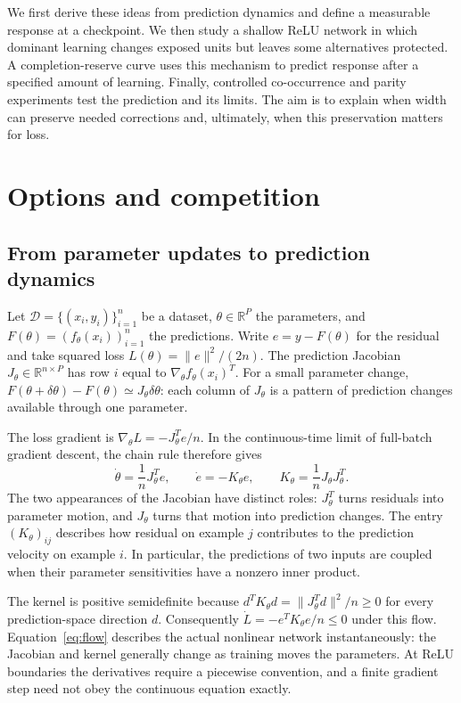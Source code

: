 \documentclass[11pt,a4paper]{article}
\begin{document}
We first derive these ideas from prediction dynamics and define a measurable response at a checkpoint. We then study a shallow ReLU network in which dominant learning changes exposed units but leaves some alternatives protected. A completion-reserve curve uses this mechanism to predict response after a specified amount of learning. Finally, controlled co-occurrence and parity experiments test the prediction and its limits. The aim is to explain when width can preserve needed corrections and, ultimately, when this preservation matters for loss.

\section{Options and competition}
\label{sec:core}

\subsection{From parameter updates to prediction dynamics}

Let $\mathcal D=\{(x_i,y_i)\}_{i=1}^n$ be a dataset, $\theta\in\mathbb R^P$ the parameters, and $F(\theta)=(f_\theta(x_i))_{i=1}^n$ the predictions. Write $e=y-F(\theta)$ for the residual and take squared loss $L(\theta)=\|e\|^2/(2n)$. The prediction Jacobian $J_\theta\in\mathbb R^{n\times P}$ has row $i$ equal to $\nabla_\theta f_\theta(x_i)^T$. For a small parameter change, $F(\theta+\delta\theta)-F(\theta)\simeq J_\theta\delta\theta$: each column of $J_\theta$ is a pattern of prediction changes available through one parameter.

The loss gradient is $\nabla_\theta L=-J_\theta^Te/n$. In the continuous-time limit of full-batch gradient descent, the chain rule therefore gives
\begin{equation}
 \dot\theta=\frac1n J_\theta^T e,\qquad
 \dot e=-K_\theta e,\qquad K_\theta=\frac1nJ_\theta J_\theta^T.
 \label{eq:flow}
\end{equation}
The two appearances of the Jacobian have distinct roles: $J_\theta^T$ turns residuals into parameter motion, and $J_\theta$ turns that motion into prediction changes. The entry $(K_\theta)_{ij}$ describes how residual on example $j$ contributes to the prediction velocity on example $i$. In particular, the predictions of two inputs are coupled when their parameter sensitivities have a nonzero inner product.

The kernel is positive semidefinite because $d^TK_\theta d=\|J_\theta^Td\|^2/n\ge0$ for every prediction-space direction $d$. Consequently $\dot L=-e^TK_\theta e/n\le0$ under this flow. Equation~\eqref{eq:flow} describes the actual nonlinear network instantaneously: the Jacobian and kernel generally change as training moves the parameters. At ReLU boundaries the derivatives require a piecewise convention, and a finite gradient step need not obey the continuous equation exactly.
\end{document}
